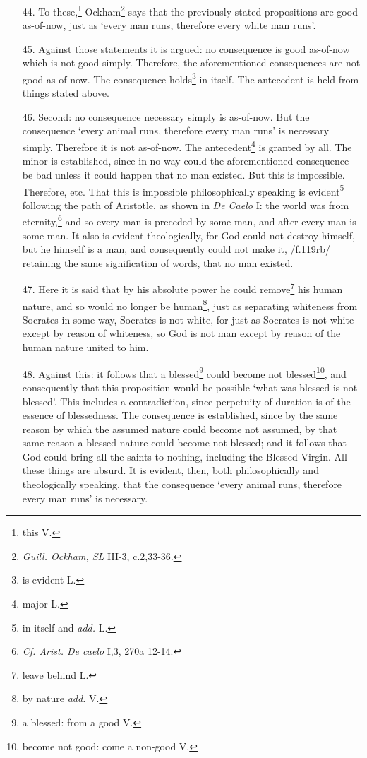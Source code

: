 \documentclass[]{article}
\begin{document}
\begin{enumerate}
	\item[44.] To these,\footnote{this V.} Ockham\footnote{\textit{Guill. Ockham, SL} III-3, c.2,33-36.} says that the previously stated propositions are good as-of-now, just as `every man runs, therefore every white man runs'. 
	\item[45.] Against those statements it is argued: no consequence is good as-of-now which is not good simply. Therefore, the aforementioned consequences are not good as-of-now. The consequence holds\footnote{is evident L.} in itself. The antecedent is held from things stated above.
	\item[46.] Second: no consequence necessary simply is as-of-now. But the consequence `every animal runs, therefore every man runs' is necessary simply. Therefore it is not as-of-now. The antecedent\footnote{major L.} is granted by all. The minor is established, since in no way could the aforementioned consequence be bad unless it could happen that no man existed. But this is impossible. Therefore, etc. That this is impossible philosophically speaking is evident\footnote{in itself and \textit{add.} L.}  following the path of Aristotle, as shown in \textit{De Caelo} I: the world was from eternity,\footnote{\textit{Cf. Arist. De caelo} I,3, 270a 12-14.} and so every man is preceded by some man, and after every man is some man. It also is evident theologically, for God could not destroy himself, but he himself is a man, and consequently could not make it, /f.119rb/ retaining the same signification of words, that  no man existed.
	\item[47.] Here it is said that by his absolute power he could remove\footnote{leave behind L.} his human nature, and so would no longer be human\footnote{by nature \textit{add.} V.}, just as separating whiteness from Socrates in some way, Socrates is not white, for just as Socrates is not white except by reason of whiteness, so God is not man except by reason of the human nature united to him.
	\item[48.] Against this: it follows that a blessed\footnote{a blessed: from a good V.} could become not blessed\footnote{become not good: come a non-good V.}, and consequently that this proposition would be possible `what was blessed is not blessed'. This includes a contradiction, since perpetuity of duration is of the essence of blessedness. The consequence is established, since by the same reason by which the assumed nature could become not assumed, by that same reason a blessed nature could become not blessed; and it follows that God could bring all the saints to nothing, including the Blessed Virgin. All these things are absurd. It is evident, then, both philosophically and theologically speaking, that the consequence `every animal runs, therefore every man runs' is necessary. 

\end{enumerate}
\end{document}
